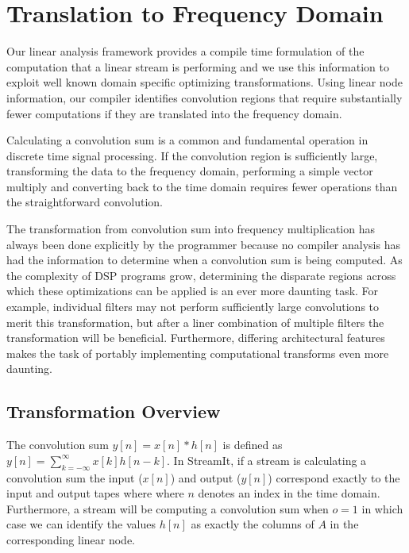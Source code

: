 
\section{Translation to Frequency Domain}
\label{sec:freq}

Our linear analysis framework provides a compile time formulation of
the computation that a linear stream is performing and we
use this information to exploit well known domain specific optimizing
transformations.  Using linear node information, our compiler
identifies convolution regions that require substantially fewer
computations if they are translated into the frequency domain.

Calculating a convolution sum is a common and fundamental operation in
discrete time signal processing.  If the convolution region is
sufficiently large, transforming the data to the frequency domain,
performing a simple vector multiply and converting back to the time
domain requires fewer operations than the straightforward convolution.

The transformation from convolution sum into frequency multiplication
has always been done explicitly by the programmer because no compiler
analysis has had the information to determine when a convolution sum
is being computed.  As the complexity of DSP programs grow,
determining the disparate regions across which these optimizations can
be applied is an ever more daunting task. For example, individual
filters may not perform sufficiently large convolutions to merit this
transformation, but after a liner combination of multiple filters the
transformation will be beneficial.  Furthermore, differing
architectural features makes the task of portably implementing 
computational transforms even more daunting.

\subsection{Transformation Overview}
The convolution sum $y[n]=x[n]*h[n]$ is defined as
$y[n]=\sum_{k=-\infty}^{\infty}x[k]h[n-k]$. In StreamIt, if a 
stream is calculating a convolution sum the input
($x[n]$) and output ($y[n]$) correspond exactly to the input and
output tapes where where $n$ denotes an index in the time domain.  
Furthermore, a stream will be computing a
convolution sum when $o=1$ in which case we can identify the values
$h[n]$ as exactly the columns of $A$ in the corresponding linear node.

